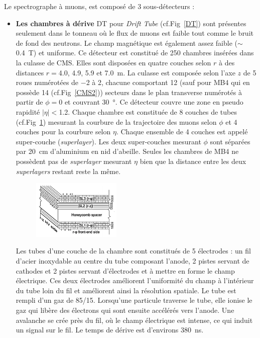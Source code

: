Le spectrographe à muons, est composé de \num{3} sous-détecteurs :
\begin{itemize}[label=$\bullet$]
	\item \textbf{Les chambres à dérive} DT pour \textit{Drift Tube} (cf.Fig~\ref{DT}) sont présentes seulement dans le tonneau où le flux de muons est faible tout comme le bruit de fond des neutrons. Le champ magnétique est également assez faible ($\sim$\SI{0.4}{\tesla}) et uniforme. Ce détecteur est constitué de \num{250} chambres insérées dans la culasse de CMS. Elles sont disposées en quatre couches selon $r$ à des distances $r=$\num{4.0}, \num{4.9}, \num{5.9} et \SI{7.0}{\meter}. La culasse est composée selon l'axe $z$ de \num{5} roues numérotées de $-$\num{2} à \num{2}, chacune comportant \num{12} (sauf pour MB4 qui en possède \num{14} (cf.Fig~\ref{CMS2})) secteurs dans le plan transverse numérotés à partir de $\phi=$\num{0} et couvrant \SI{30}{\degree}. Ce détecteur couvre une zone en pseudo rapidité $|\eta|<$\num{1.2}. Chaque chambre est constituée de \num{8} couches de tubes (cf.Fig~\ref{DT1}) mesurant la courbure de la trajectoire des muons selon $\phi$ et \num{4} couches pour la courbure selon $\eta$. Chaque ensemble de \num{4} couches est appelé super-couche (\textit{superlayer}). Les deux super-couches mesurant $\phi$ sont séparées par \SI{20}{\centi\meter} d'aluminium en nid d'abeille. Seules les chambres de MB4 ne possèdent pas de \textit{superlayer} mesurant $\eta$ bien que la distance entre les deux \textit{superlayers} restant reste la même.
	\begin{figure}[ht!]
		\centering
		\includegraphics[width=0.40\textwidth]{CMS/DTchamber.png}
		\label{DT1}
	\end{figure}

    Les tubes d'une couche de la chambre sont constitués de \num{5} électrodes : un fil d'acier inoxydable au centre du tube composant l'anode, \num{2} pistes servant de cathodes et \num{2} pistes servant d'électrodes et à mettre en forme le champ électrique. Ces deux électrodes améliorent l'uniformité du champ à l'intérieur du tube loin du fil et améliorent ainsi la résolution spatiale. Le tube est rempli d'un gaz de  \num{85}/\num{15}. Lorsqu'une particule traverse le tube, elle ionise le gaz qui libère des électrons qui sont ensuite accélérés vers l'anode. Une avalanche se crée près du fil, où le champ électrique est intense, ce qui induit un signal sur le fil. Le temps de dérive est d'environs \SI{380}{\nano\second}. 
    

\end{itemize}
